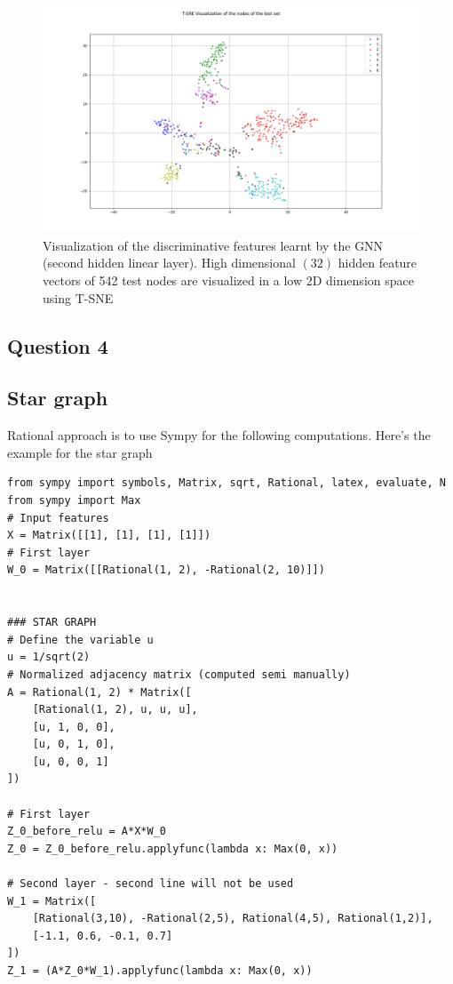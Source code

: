 \documentclass[a4paper]{article}
\begin{document}
\begin{figure}[ht]
    \centering
    \includegraphics[width=1.\textwidth]{figures/tSNE_Cora.png}
    \caption{Visualization of the discriminative features learnt by the GNN (second hidden linear layer). 
    High dimensional $(32)$ hidden feature vectors of 542 test nodes are visualized in a low 2D dimension space using T-SNE}
    \label{fig:tsne_cora}
\end{figure}
\break
\subsection*{Question 4}

\subsection*{Star graph}

Rational approach is to use Sympy for the following computations.
Here's the example for the star graph
\begin{verbatim}
from sympy import symbols, Matrix, sqrt, Rational, latex, evaluate, N
from sympy import Max
# Input features
X = Matrix([[1], [1], [1], [1]])
# First layer
W_0 = Matrix([[Rational(1, 2), -Rational(2, 10)]])


### STAR GRAPH
# Define the variable u
u = 1/sqrt(2)
# Normalized adjacency matrix (computed semi manually)
A = Rational(1, 2) * Matrix([
    [Rational(1, 2), u, u, u],
    [u, 1, 0, 0],
    [u, 0, 1, 0],
    [u, 0, 0, 1]
])

# First layer
Z_0_before_relu = A*X*W_0
Z_0 = Z_0_before_relu.applyfunc(lambda x: Max(0, x))

# Second layer - second line will not be used
W_1 = Matrix([
    [Rational(3,10), -Rational(2,5), Rational(4,5), Rational(1,2)],
    [-1.1, 0.6, -0.1, 0.7]
])
Z_1 = (A*Z_0*W_1).applyfunc(lambda x: Max(0, x))
\end{verbatim}
\end{document}
